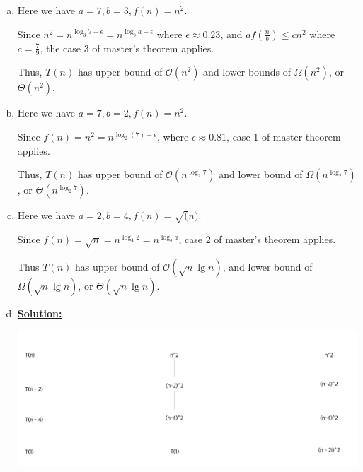 \documentclass[12pt]{article}
\begin{document}
\begin{enumerate}[1.]
\begin{enumerate}[a)]
        \item

        Here we have $a = 7, b = 3, f(n) = n^2$.

        \bigskip

        Since $n^2 = n^{\log_3 7 + \epsilon} = n^{\log_b a + \epsilon}$ where $\epsilon \approx 0.23$,
        and $af(\frac{n}{b}) \leq cn^2$ where $c = \frac{7}{9}$, the case 3 of master's theorem applies.

        \bigskip

        Thus, $T(n)$ has upper bound of $\mathcal{O}(n^2)$ and lower bounds of $\Omega(n^2)$, or $\Theta(n^2)$.

        \bigskip

        \item

        Here we have $a = 7, b = 2, f(n) = n^2$.

        \bigskip

        Since $f(n) = n^2 = n^{\log_2 (7) - \epsilon}$, where $\epsilon \approx 0.81$,
        case 1 of master theorem applies.

        \bigskip

        Thus, $T(n)$ has upper bound of $\mathcal{O}(n^{\log_2 7})$ and lower bound of $\Omega(n^{\log_2 7})$, or $\Theta(n^{\log_2 7})$.

        \bigskip

        \item

        Here we have $a = 2, b = 4 , f(n) = \sqrt(n)$.

        \bigskip

        Since $f(n) = \sqrt{n} = n^{\log_4 2} = n^{\log_b a}$, case 2 of master's theorem
        applies.

        \bigskip

        Thus $T(n)$ has upper bound of $\mathcal{O}(\sqrt{n}\lg n)$, and lower bound of
        $\Omega(\sqrt{n}\lg n)$, or $\Theta(\sqrt{n} \lg n)$.

        \item \underline{\textbf{Solution:}}

        \begin{center}
        \includegraphics[width=\linewidth]{images/worksheet_0_solution_11.png}
        \end{center}


\end{enumerate}
\end{enumerate}
\end{document}
